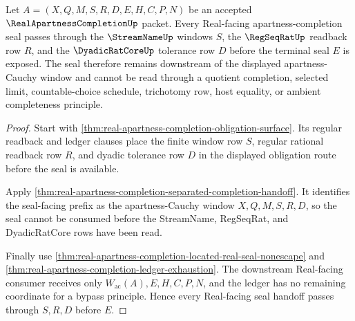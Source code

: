 \begin{theorem}
\label{thm:real-apartness-completion-regseqrat-seal}
Let $A=(X,Q,M,S,R,D,E,H,C,P,N)$ be an accepted $\RealApartnessCompletionUp$ packet. Every Real-facing apartness-completion seal passes through the $\StreamNameUp$ windows $S$, the $\RegSeqRatUp$ readback row $R$, and the $\DyadicRatCoreUp$ tolerance row $D$ before the terminal seal $E$ is exposed. The seal therefore remains downstream of the displayed apartness-Cauchy window and cannot be read through a quotient completion, selected limit, countable-choice schedule, trichotomy row, host equality, or ambient completeness principle.
\end{theorem}
\begin{proof}
Start with \autoref{thm:real-apartness-completion-obligation-surface}. Its regular readback and ledger clauses place the finite window row $S$, regular rational readback row $R$, and dyadic tolerance row $D$ in the displayed obligation route before the seal is available.

Apply \autoref{thm:real-apartness-completion-separated-completion-handoff}. It identifies the seal-facing prefix as the apartness-Cauchy window $X,Q,M,S,R,D$, so the seal cannot be consumed before the StreamName, RegSeqRat, and DyadicRatCore rows have been read.

Finally use \autoref{thm:real-apartness-completion-located-real-seal-nonescape} and \autoref{thm:real-apartness-completion-ledger-exhaustion}. The downstream Real-facing consumer receives only $W_{\mathrm{ac}}(A),E,H,C,P,N$, and the ledger has no remaining coordinate for a bypass principle. Hence every Real-facing seal handoff passes through $S,R,D$ before $E$.
\end{proof}

